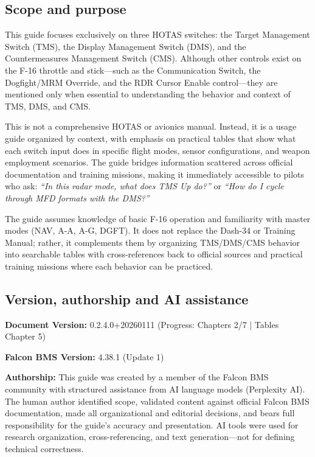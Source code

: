 \documentclass[11pt,a4paper]{article}
\newcommand{\docversion}{0.2.4.0} %
\newcommand{\docbuild}{20260111}
\newcommand{\chapterscompletedof}{2/7}
\newcommand{\tablesfilledpct}{Chapter 5}
\newcommand{\fulldocversion}{\docversion+\docbuild}
\begin{document}
\subsection{Scope and purpose}

This guide focuses exclusively on three HOTAS switches: the Target Management Switch (TMS), the Display Management Switch (DMS), and the Countermeasures Management Switch (CMS). Although other controls exist on the F-16 throttle and stick---such as the Communication Switch, the Dogfight/MRM Override, and the RDR Cursor Enable control---they are mentioned only when essential to understanding the behavior and context of TMS, DMS, and CMS.

This is not a comprehensive HOTAS or avionics manual. Instead, it is a usage guide organized by context, with emphasis on practical tables that show what each switch input does in specific flight modes, sensor configurations, and weapon employment scenarios. The guide bridges information scattered across official documentation and training missions, making it immediately accessible to pilots who ask: \emph{``In this radar mode, what does TMS Up do?''} or \emph{``How do I cycle through MFD formats with the DMS?''}

The guide assumes knowledge of basic F-16 operation and familiarity with master modes (NAV, A-A, A-G, DGFT). It does not replace the Dash-34 or Training Manual; rather, it complements them by organizing TMS/DMS/CMS behavior into searchable tables with cross-references back to official sources and practical training missions where each behavior can be practiced.

\subsection{Version, authorship and AI assistance}

\textbf{Document Version:} \fulldocversion{} (Progress: Chapters \chapterscompletedof{} | Tables \tablesfilledpct)

\textbf{Falcon BMS Version:} 4.38.1 (Update 1)

\textbf{Authorship:} This guide was created by a member of the Falcon BMS community with structured assistance from AI language models (Perplexity AI). The human author identified scope, validated content against official Falcon BMS documentation, made all organizational and editorial decisions, and bears full responsibility for the guide's accuracy and presentation. AI tools were used for research organization, cross-referencing, and text generation---not for defining technical correctness.
\end{document}
